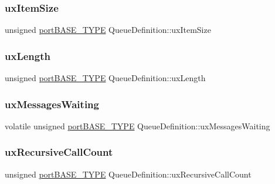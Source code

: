 \subsubsection{\texorpdfstring{ux\+Item\+Size}{uxItemSize}}
{\footnotesize\ttfamily unsigned \mbox{\hyperlink{portmacro_8h_a1ebe82d24d764ae4e352f7c3a9f92c01}{port\+B\+A\+S\+E\+\_\+\+T\+Y\+PE}} Queue\+Definition\+::ux\+Item\+Size}

\mbox{\label{struct_queue_definition_af1edbb7426dad16a57e1fc6bb475bc7e}} 
\subsubsection{\texorpdfstring{ux\+Length}{uxLength}}
{\footnotesize\ttfamily unsigned \mbox{\hyperlink{portmacro_8h_a1ebe82d24d764ae4e352f7c3a9f92c01}{port\+B\+A\+S\+E\+\_\+\+T\+Y\+PE}} Queue\+Definition\+::ux\+Length}

\mbox{\label{struct_queue_definition_a8e3b24b25631daa65cc8b860346013e3}} 
\subsubsection{\texorpdfstring{ux\+Messages\+Waiting}{uxMessagesWaiting}}
{\footnotesize\ttfamily volatile unsigned \mbox{\hyperlink{portmacro_8h_a1ebe82d24d764ae4e352f7c3a9f92c01}{port\+B\+A\+S\+E\+\_\+\+T\+Y\+PE}} Queue\+Definition\+::ux\+Messages\+Waiting}

\mbox{\label{struct_queue_definition_a0582284771e9c079fa3276a31f3805ad}} 
\subsubsection{\texorpdfstring{ux\+Recursive\+Call\+Count}{uxRecursiveCallCount}}
{\footnotesize\ttfamily unsigned \mbox{\hyperlink{portmacro_8h_a1ebe82d24d764ae4e352f7c3a9f92c01}{port\+B\+A\+S\+E\+\_\+\+T\+Y\+PE}} Queue\+Definition\+::ux\+Recursive\+Call\+Count}

